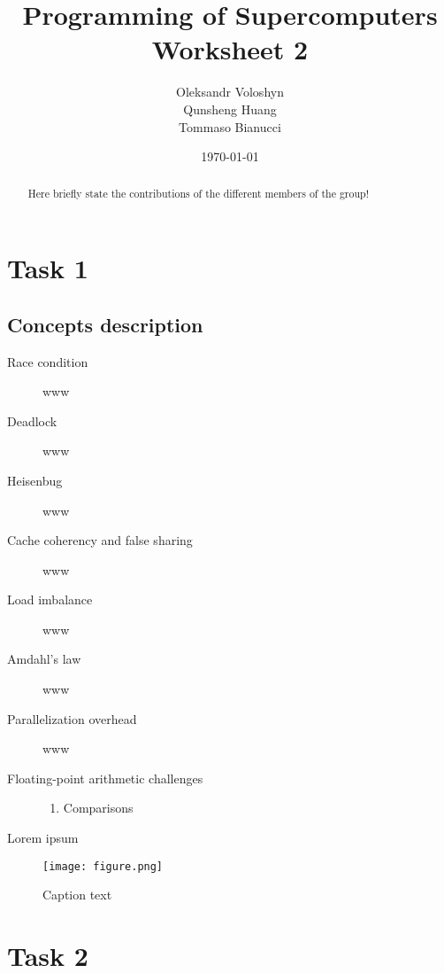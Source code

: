 \documentclass{article}
\title{Programming of Supercomputers\\Worksheet 2}
\author{Oleksandr Voloshyn\\ Qunsheng Huang\\ Tommaso Bianucci}
\date{\today}
\begin{document}
\maketitle
\renewcommand{\abstractname}{Group members's contributions}
\begin{abstract}
	Here briefly state the contributions of the different members of the group!
\end{abstract}

\section{Task 1}
\subsection{Concepts description}
\begin{description}
	\item[Race condition] www
	\item[Deadlock] www
	\item[Heisenbug] www
	\item[Cache coherency and false sharing] www
	\item[Load imbalance] www
	\item[Amdahl's law] www
	\item[Parallelization overhead] www
	\item[Floating-point arithmetic challenges]
		\begin{enumerate}[label=\Alph*]
			\item Comparisons
		\end{enumerate}
\end{description}
Lorem ipsum

\begin{figure}[h!] %
 	\begin{center}
 		\texttt{[image: figure.png]} %
 		\caption{Caption text}
 		\label{fig:figureLabelName}
 	\end{center}
\end{figure}

\section{Task 2}
\end{document}
